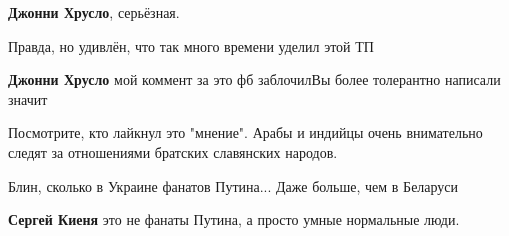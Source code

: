 \begin{itemize}
\begin{itemize}
 
\textbf{Джонни Хрусло}, серьёзная.

 
Правда, но удивлён, что так много времени уделил этой ТП

 
\textbf{Джонни Хрусло} мой коммент за это фб заблочил\Laughey[1.0][white] Вы более толерантно написали значит\Laughey[1.0][white]
\end{itemize}

 
Посмотрите, кто лайкнул это "мнение". Арабы и индийцы очень внимательно следят за отношениями братских славянских народов.

 
Блин, сколько в Украине фанатов Путина... Даже больше, чем в Беларуси

\begin{itemize}
 
\textbf{Сергей Киеня} это не фанаты Путина, а просто умные нормальные люди.
\end{itemize}

 

\end{itemize}
